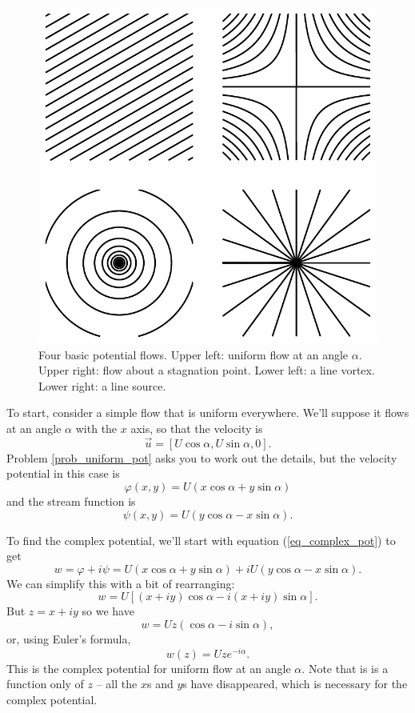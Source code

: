 \begin{figure}
\centering\includegraphics[width=0.6\linewidth]{Figures/Chapter4/fig_basic_flows}
\caption{Four basic potential flows.  Upper left: uniform flow at an angle $\alpha$.  Upper right: flow about a stagnation point.  Lower left: a line vortex.  Lower right: a line source.}
\label{fig_basic_flows}
\end{figure}

\begin{example}
To start, consider a simple flow that is uniform everywhere.  We'll suppose it flows at an angle $\alpha$ with the $x$ axis, so that the velocity is
\begin{equation}
\vec{u} = [U\cos \alpha, U\sin \alpha, 0].
\end{equation}
Problem \ref{prob_uniform_pot} asks you to work out the details, but the velocity potential in this case is
\begin{equation}
\varphi (x, y) = U(x \cos\alpha + y\sin\alpha)
\end{equation}
and the stream function is
\begin{equation}
\psi (x, y) = U(y \cos\alpha - x\sin\alpha).
\end{equation}

To find the complex potential, we'll start with equation (\ref{eq_complex_pot}) to get
\[
w = \varphi + i\psi = U(x \cos\alpha + y\sin\alpha) + iU(y \cos\alpha - x\sin\alpha).
\]
We can simplify this with a bit of rearranging:
\[
w = U \left[ (x+iy) \cos\alpha - i(x+iy) \sin\alpha \right].
\]
But $z = x+iy$ so we have
\[
w = Uz(\cos\alpha - i\sin\alpha),
\]
or, using Euler's formula,
\begin{equation}
w(z) = Uze^{-i\alpha}.
\end{equation}
This is the complex potential for uniform flow at an angle $\alpha$.  Note that is is a function only of $z$ -- all the $x$s and $y$s have disappeared, which is necessary for the complex potential.
\end{example}

